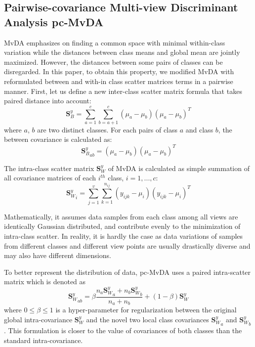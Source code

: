 
\subsection{Pairwise-covariance Multi-view Discriminant Analysis pc-MvDA}
    MvDA emphasizes on finding a common space with minimal within-class variation while the distances between class means and global mean are jointly maximized. However, the distances between some pairs of classes can be disregarded. In this paper, to obtain this property, we modified MvDA with reformulated between and with-in class scatter matrices terms in a pairwise manner. First, let us define a new inter-class scatter matrix formula that takes paired distance into account:
    \begin{equation}
        \boldsymbol{S}_B^y=\sum_{a=1}^{c}\sum_{b=a+1}^{c}{\left(\mu_a-\mu_b\right)\left(\mu_a-\mu_b\right)^T}
    \end{equation}
    where $a$, $b$ are two distinct classes. For each pairs of class $a$ and class $b$, the between covariance is calculated as:
    \begin{equation}
        {\boldsymbol{S}_B^y}_{ab}={\left(\mu_a-\mu_b\right)\left(\mu_a-\mu_b\right)^T}
        \label{eq:Sb_ab}
    \end{equation}

    The intra-class scatter matrix $\boldsymbol{S}_W^y$ of MvDA is calculated as simple summation of all covariance matrices of each $i^{th}$ class, $i = {1,...,c}$:
    \begin{equation}
        {\boldsymbol{S}_W^y}_i=\sum_{j=1}^{v}\sum_{k=1}^{n_{ij}}{\left(y_{ijk}-\mu_i\right)\left(y_{ijk}-\mu_i\right)^T}
    \end{equation}

    Mathematically, it assumes data samples from each class among all views are identically Gaussian distributed, and contribute evenly to the minimization of intra-class scatter. In reality, it is hardly the case as data variations of samples from different classes and different view points are usually drastically diverse and may also have different dimensions.

    To better represent the distribution of data, pc-MvDA uses a paired intra-scatter matrix which is denoted as
    \begin{equation}
        {\boldsymbol{S}_W^y}_{ab}=\beta\frac{n_a{\boldsymbol{S}_W^y}_a+n_b{\boldsymbol{S}_W^y}_b}{n_a+n_b}+\left(1-\beta\right){\boldsymbol{S}_W^y}
        \label{eq:Sw_ab}
    \end{equation}
    where $0\le\beta\le1$ is a hyper-parameter for regularization between the original global intra-covariance ${\boldsymbol{S}_W^y}$ and the novel two local class covariances ${\boldsymbol{S}_W^y}_a$ and ${\boldsymbol{S}_W^y}_b$. This formulation is closer to the value of covariances of both classes than the standard intra-covariance.

